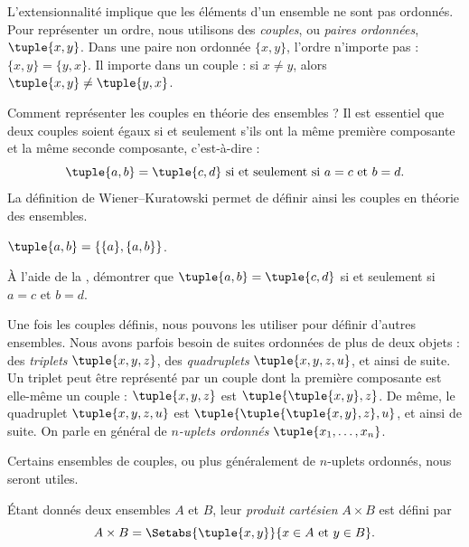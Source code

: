 \documentclass[11pt,a4paper,openany]{memoir}
\begin{document}
\begin{explain}
L'extensionnalité implique que les éléments d'un ensemble ne
sont pas ordonnés. Pour représenter un ordre, nous utilisons
des \emph{couples}, ou \emph{paires ordonnées}, $\tuple{x, y}$.
Dans une paire non ordonnée $\{x, y\}$, l'ordre n'importe pas :
$\{x, y\} = \{y, x\}$. Il importe dans un couple :
si $x \neq y$, alors $\tuple{x, y} \neq \tuple{y, x}$.

Comment représenter les couples en théorie des ensembles ?
Il est essentiel que deux couples soient égaux si et seulement
s'ils ont la même première composante et la même seconde
composante, c'est-à-dire :
\[
  \tuple{a, b}= \tuple{c, d}\text{ si et seulement si }a = c \text{ et }b=d.
\]
La définition de Wiener--Kuratowski permet de définir ainsi
les couples en théorie des ensembles.
\end{explain}

\begin{defn}[Couple]
	$\tuple{a, b} = \{\{a\}, \{a, b\}\}$.
\end{defn}

\begin{prob}
	À l'aide de la ,
	démontrer que $\tuple{a, b}= \tuple{c, d}$ si et seulement si
	$a = c$ et $b=d$.
\end{prob}

\begin{explain}
Une fois les couples définis, nous pouvons les utiliser pour
définir d'autres ensembles. Nous avons parfois besoin de suites
ordonnées de plus de deux objets : des \emph{triplets}
$\tuple{x, y, z}$, des \emph{quadruplets} $\tuple{x, y, z, u}$,
et ainsi de suite. Un triplet peut être représenté par un couple
dont la première composante est elle-même un couple :
$\tuple{x, y, z}$ est $\tuple{\tuple{x, y},z}$.
De même, le quadruplet $\tuple{x,y,z,u}$ est
$\tuple{\tuple{\tuple{x,y},z},u}$, et ainsi de suite.
On parle en général de \emph{$n$-uplets ordonnés}
$\tuple{x_1, \dots, x_n}$.

Certains ensembles de couples, ou plus généralement de
$n$-uplets ordonnés, nous seront utiles.
\end{explain}

\begin{defn}
Étant donnés deux ensembles $A$ et $B$, leur \emph{produit cartésien}
$A \times B$ est défini par
\[
  A \times B = \Setabs{\tuple{x, y}}{x \in A \text{ et } y \in B}.
\]
\end{defn}
\end{document}
